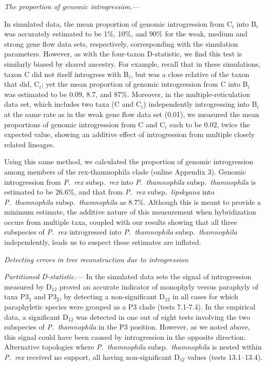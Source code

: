 \documentclass[12pt,letterpaper]{article}
\renewcommand{\subsection}[1]{%
\bigskip
\begin{center}
\begin{large}
\normalfont\itshape #1
\end{large}
\end{center}}
\renewcommand{\subsubsection}[1]{%
\vspace{2ex}
\noindent
\textit{#1.}---}
\begin{document}
\subsubsection{The proportion of genomic introgression}

In simulated data, the mean proportion of genomic introgression from
C$_i$ into B$_i$ was accurately estimated to be 1\%, 10\%, and 90\%
for the weak, medium and strong gene flow data sets, respectively,
corresponding with the simulation parameters.  However, as with the
four-taxon D-statistic, we find this test is similarly biased by
shared ancestry. For example, recall that in these simulations, taxon
C did not itself introgress with B$_i$, but was a close relative of
the taxon that did, C$_i$; yet the mean proportion of genomic
introgression from C into B$_i$ was estimated to be 0.09, 8.7, and
87\%.  Moreover, in the multiple-reticulation data set, which
includes two taxa (C and C$_i$) independently introgressing into B$_i$
at the same rate as in the weak gene flow data set (0.01), we measured
the mean proportions of genomic introgression from C and C$_i$ each to
be 0.02, twice the expected value, showing an additive effect of
introgression from multiple closely related lineages.

Using this same method, we calculated the proportion of genomic
introgression among members of the rex-thamnophila clade (online 
Appendix 3). Genomic introgression from \emph{P.~rex} subsp.\ \emph{rex} into
\emph{P.~thamnophila} subsp.\ \emph{thamnophila} is estimated to be
26.6\%, and that from \emph{P.~rex} subsp.\ \emph{lipskyana} into
\emph{P.~thamnophila} subsp.\ \emph{thamnophila} as 8.7\%.
Although this is meant to provide a minimum estimate, the additive
nature of this measurement when hybridization occurs from multiple
taxa, coupled with our results showing that all three subspecies of
\emph{P.~rex} introgressed into \emph{P.~thamnophila}
subsp.\ \emph{thamnophila} independently, leads us to suspect these
estimates are inflated.

\subsection{Detecting errors in tree reconstruction due to
  introgression}

\subsubsection{Partitioned D-statistic}
In the simulated data sets the signal of introgression measured by
D$_{12}$ proved an accurate indicator of monophyly versus paraphyly of
taxa P3$_{1}$ and P3$_{2}$, by detecting a non-significant D$_{12}$ in
all cases for which paraphyletic species were grouped as a P3 clade
(tests 7.1-7.4). In the empirical data, a significant D$_{12}$ was
detected in one out of eight tests involving the two subspecies of
\emph{P.~thamnophila} in the P3 position. However, as we noted above,
this signal could have been caused by introgression in the opposite
direction.  Alternative topologies where \emph{P.~thamnophila} subsp.\
\emph{thamnophila} is nested within \emph{P.~rex} received no support,
all having non-significant D$_{12}$ values (tests 13.1--13.4).
\end{document}

